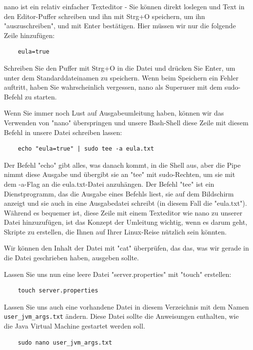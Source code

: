 \documentclass[]{article}
\begin{document}
nano ist ein relativ einfacher Texteditor - Sie können direkt loslegen und Text in den Editor-Puffer schreiben und ihn mit Strg+O speichern, um ihn "auszuschreiben", und mit Enter bestätigen. Hier müssen wir nur die folgende Zeile hinzufügen:

\begin{verbatim}
	eula=true
\end{verbatim}

Schreiben Sie den Puffer mit Strg+O in die Datei und drücken Sie Enter, um unter dem Standarddateinamen zu speichern. Wenn beim Speichern ein Fehler auftritt, haben Sie wahrscheinlich vergessen, nano als Superuser mit dem sudo-Befehl zu starten.

Wenn Sie immer noch Lust auf Ausgabeumleitung haben, können wir das Verwenden von "nano" überspringen und unsere Bash-Shell diese Zeile mit diesem Befehl in unsere Datei schreiben lassen:

\begin{verbatim}
	echo "eula=true" | sudo tee -a eula.txt
\end{verbatim}

Der Befehl "echo" gibt alles, was danach kommt, in die Shell aus, aber die Pipe nimmt diese Ausgabe und übergibt sie an "tee" mit sudo-Rechten, um sie mit dem -a-Flag an die eula.txt-Datei anzuhängen. Der Befehl "tee" ist ein Dienstprogramm, das die Ausgabe eines Befehls liest, sie auf dem Bildschirm anzeigt und sie auch in eine Ausgabedatei schreibt (in diesem Fall die "eula.txt"). Während es bequemer ist, diese Zeile mit einem Texteditor wie nano zu unserer Datei hinzuzufügen, ist das Konzept der Umleitung wichtig, wenn es darum geht, Skripte zu erstellen, die Ihnen auf Ihrer Linux-Reise nützlich sein könnten.

Wir können den Inhalt der Datei mit "cat" überprüfen, das das, was wir gerade in die Datei geschrieben haben, ausgeben sollte.

Lassen Sie uns nun eine leere Datei "server.properties" mit "touch" erstellen:

\begin{verbatim}
	touch server.properties
\end{verbatim}

Lassen Sie uns auch eine vorhandene Datei in diesem Verzeichnis mit dem Namen \texttt{user\_jvm\_args.txt} ändern. Diese Datei sollte die Anweisungen enthalten, wie die Java Virtual Machine gestartet werden soll.

\begin{verbatim}
	sudo nano user_jvm_args.txt
\end{verbatim}
\end{document}
